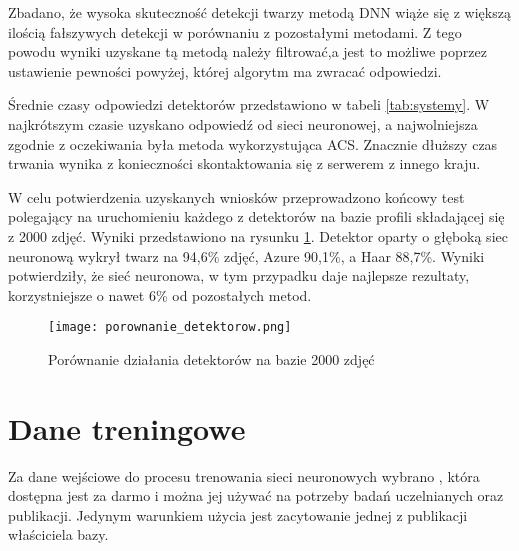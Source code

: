 Zbadano, że wysoka skuteczność detekcji twarzy metodą DNN wiąże się z większą ilością fałszywych detekcji w porównaniu z pozostałymi metodami. Z tego powodu wyniki uzyskane tą metodą należy filtrować,a jest to możliwe poprzez ustawienie pewności powyżej, której algorytm ma zwracać odpowiedzi.

Średnie czasy odpowiedzi detektorów przedstawiono w tabeli \ref{tab:systemy}. W najkrótszym czasie uzyskano odpowiedź od sieci neuronowej, a najwolniejsza zgodnie z oczekiwania była metoda wykorzystująca ACS. Znacznie dłuższy czas trwania wynika z konieczności skontaktowania się z serwerem z innego kraju.

\begin{table}[H]\label{tab:systemy}
	\centering
	\caption{Średni czas przetwarzania zadania detekcji twarzy}
\end{table}

W celu potwierdzenia uzyskanych wniosków przeprowadzono końcowy test polegający na uruchomieniu każdego z detektorów na bazie profili składającej się z 2000 zdjęć. Wyniki przedstawiono na rysunku \ref{fig:porownanie_detektorow}. Detektor oparty o głęboką siec neuronową wykrył twarz na 94,6\% zdjęć, Azure 90,1\%, a Haar 88,7\%. Wyniki potwierdziły, że sieć neuronowa, w tym przypadku daje najlepsze rezultaty, korzystniejsze o nawet 6\% od pozostałych metod.

\begin{figure}[H]
	\centering
	\texttt{[image: porownanie\_detektorow.png]}
	\caption{Porównanie działania detektorów na bazie 2000 zdjęć}
	\label{fig:porownanie_detektorow}
\end{figure}

\section{Dane treningowe}
Za dane wejściowe do procesu trenowania sieci neuronowych wybrano , która dostępna jest za darmo i można jej używać na potrzeby badań uczelnianych oraz publikacji. Jedynym warunkiem użycia jest zacytowanie jednej z publikacji właściciela bazy.

